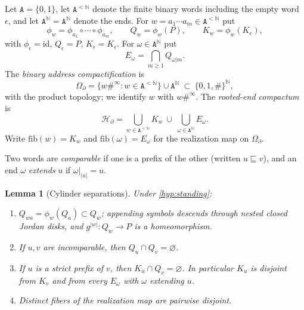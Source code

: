 \documentclass[11pt,reqno]{amsart}
\numberwithin{equation}{section}
\theoremstyle{plain}
\newtheorem{lemma}[theorem]{Lemma}
\theoremstyle{definition}
\theoremstyle{remark}
\newcommand{\N}{\mathbb N}
\newcommand{\A}{\mathtt A}
\newcommand{\Words}{\A^{<\N}}
\newcommand{\Ends}{\A^{\N}}
\newcommand{\OmB}{\Omega_\partial}
\newcommand{\HB}{\mathcal H_\partial}
\newcommand{\rootK}{K_{\epsilon}}
\begin{document}
Let $\A=\{0,1\}$, let $\Words$ denote the finite binary words including
the empty word $\epsilon$, and let $\Ends=\A^{\N}$ denote the ends.  For
$w=a_1\cdots a_m\in\Words$ put
\begin{equation}
 \phi_w=\phi_{a_1}\circ\cdots\circ\phi_{a_m},
 \qquad
 Q_w=\phi_w(P),
 \qquad
 K_w=\phi_w(\rootK),
\label{eq:finite-fibers}
\end{equation}
with $\phi_\epsilon=\mathrm{id}$, $Q_\epsilon=P$, $K_\epsilon=\rootK$.
For $\omega\in\Ends$ put
\begin{equation}
 E_\omega=\bigcap_{m\ge1}Q_{\omega|m}.
\label{eq:end-fibers}
\end{equation}
The \emph{binary address compactification} is
\begin{equation}
 \OmB
 =
 \{w\#^\infty:w\in\Words\}\cup\Ends
 \ \subset\
 \{0,1,\#\}^{\N},
\label{eq:address-space}
\end{equation}
with the product topology; we identify $w$ with $w\#^\infty$.  The
\emph{rooted-end compactum} is
\begin{equation}
 \HB
 =
 \bigcup_{w\in\Words}K_w
 \ \cup\
 \bigcup_{\omega\in\Ends}E_\omega .
\label{eq:compactum}
\end{equation}
Write $\mathrm{fib}(w)=K_w$ and $\mathrm{fib}(\omega)=E_\omega$ for the
realization map on $\OmB$.

Two words are \emph{comparable} if one is a prefix of the other
(written $u\sqsubseteq v$), and an end $\omega$ \emph{extends} $u$ if
$\omega|_{|u|}=u$.

\begin{lemma}[Cylinder separations]
\label{lem:cylinder-separations}
Under \cref{hyp:standing}:
\begin{enumerate}[label=\textup{(\alph*)}]
 \item \label{sep:nest} $Q_{wa}=\phi_w(Q_a)\subset Q_w$; appending
  symbols descends through nested closed Jordan disks, and
  $g^{|w|}\colon Q_w\to P$ is a homeomorphism.
 \item \label{sep:incomparable} If $u,v$ are incomparable, then
  $Q_u\cap Q_v=\varnothing$.
 \item \label{sep:gap} If $u$ is a strict prefix of $v$, then
  $K_u\cap Q_v=\varnothing$.  In particular $K_u$ is disjoint from
  $K_v$ and from every $E_\omega$ with $\omega$ extending $u$.
 \item \label{sep:all} Distinct fibers of the realization map are
  pairwise disjoint.
\end{enumerate}
\end{lemma}
\end{document}
